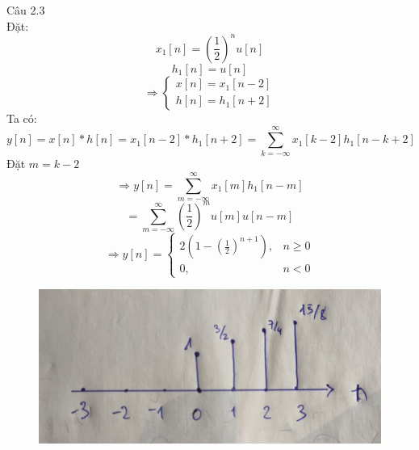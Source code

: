 \documentclass[11pt]{exam}
\begin{document}
\begin{questions}
\question Câu 2.3\\
    Đặt:
    \begin{equation*}
        x_1[n] = \left(\frac{1}{2}\right)^n u[n]
    \end{equation*}
    \begin{equation*}
        h_1[n] = u[n]
    \end{equation*}
    \begin{equation*}
        \Rightarrow 
        \begin{cases}
            x[n] = x_1[n-2] \\
            h[n] = h_1[n+2]
        \end{cases}
    \end{equation*}
    Ta có:
    \begin{equation*}
        y[n] = x[n] * h[n] = x_1[n-2] * h_1[n+2] = \sum_{k = -\infty}^{\infty}{x_1[k-2] h_1[n-k+2]}
    \end{equation*}
    Đặt $m = k - 2$
    \begin{equation*}
        \Rightarrow y[n] = \sum_{m = -\infty}^{\infty}{x_1[m] h_1[n-m]}
    \end{equation*}
    \begin{equation*}
        = \sum_{m = -\infty}^{\infty}{ \left(\frac{1}{2}\right)^m u[m] u[n-m]}
    \end{equation*}
    \begin{equation*}
        \Rightarrow y[n] = 
        \begin{cases}
            2(1 - \left(\frac{1}{2}\right)^{n+1}), & n \geq 0 \\
            0, & n < 0
        \end{cases}
    \end{equation*}
    \begin{figure}[H]
        \begin{center}
            \includegraphics[scale=0.1]{fig/2.3.jpg}
        \end{center}
    \end{figure}


\end{questions}
\end{document}
